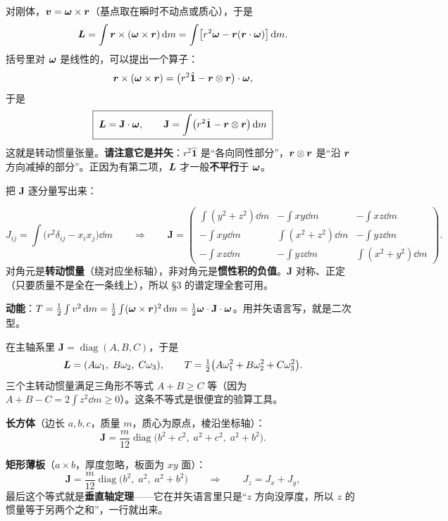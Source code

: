 \documentclass[11pt]{ctexart}
\newcommand{\ten}[1]{\mathbf{#1}}
\newcommand{\unitd}{\hat{\ten{1}}}
\let\origsubhdr\subhdr
\renewcommand{\subhdr}[1]{\par\needspace{3\baselineskip}\origsubhdr{#1}}
\begin{document}
对刚体，$\boldsymbol{v}=\boldsymbol{\omega}\times\boldsymbol{r}$（基点取在瞬时不动点或质心），于是
\[
\boldsymbol{L}=\int\boldsymbol{r}\times(\boldsymbol{\omega}\times\boldsymbol{r})\,\mathrm{d} m
=\int\bigl[r^2\boldsymbol{\omega}-\boldsymbol{r}(\boldsymbol{r}\cdot\boldsymbol{\omega})\bigr]\,\mathrm{d} m .
\]
括号里对 $\boldsymbol{\omega}$ 是线性的，可以提出一个算子：
\[
\vect r\times(\vect\omega\times\vect r)=\bigl(r^2\unitd-\vect r\otimes\vect r\bigr)\cdot\vect\omega ,
\]
于是
\[
\boxed{\;\vect L=\ten J\cdot\vect\omega,\qquad
\ten J=\int\bigl(r^2\unitd-\vect r\otimes\vect r\bigr)\dd m\;}
\]
这就是转动惯量张量。\textbf{请注意它是并矢}：$r^2\unitd$ 是“各向同性部分”，$\boldsymbol{r}\otimes\boldsymbol{r}$ 是“沿 $\boldsymbol{r}$ 方向减掉的部分”。正因为有第二项，$\boldsymbol{L}$ 才一般\textbf{不平行}于 $\boldsymbol{\omega}$。


把 $\ten J$ 逐分量写出来：

\[
J_{ij}=\int\bigl(r^2\delta_{ij}-x_ix_j\bigr)\dd m
\qquad\Longrightarrow\qquad
\ten J=
\begin{pmatrix}
\int(y^2+z^2)\dd m & -\int xy\dd m & -\int xz\dd m\\[3pt]
-\int xy\dd m & \int(x^2+z^2)\dd m & -\int yz\dd m\\[3pt]
-\int xz\dd m & -\int yz\dd m & \int(x^2+y^2)\dd m
\end{pmatrix}.
\]
对角元是\textbf{转动惯量}（绕对应坐标轴），非对角元是\textbf{惯性积的负值}。$\ten J$ 对称、正定（只要质量不是全在一条线上），所以 §3 的谱定理全套可用。

\textbf{动能}：$T=\frac12\int v^2\dd m=\frac12\int(\vect\omega\times\vect r)^2\dd m=\frac12\vect\omega\cdot\ten J\cdot\vect\omega$。用并矢语言写，就是二次型。


在主轴系里 $\ten J=\operatorname{diag}(A,B,C)$，于是
\[
\boldsymbol{L}=(A\omega_1,\;B\omega_2,\;C\omega_3),
\qquad
T=\tfrac12\bigl(A\omega_1^2+B\omega_2^2+C\omega_3^2\bigr).
\]
三个主转动惯量满足三角形不等式 $A+B\ge C$ 等（因为 $A+B-C=2\int z^2\dd m\ge0$）。这条不等式是很便宜的验算工具。


\textbf{长方体}（边长 $a,b,c$，质量 $m$，质心为原点，棱沿坐标轴）：
\[
\ten J=\frac{m}{12}\operatorname{diag}\bigl(b^2+c^2,\;a^2+c^2,\;a^2+b^2\bigr).
\]

\textbf{矩形薄板}（$a\times b$，厚度忽略，板面为 $xy$ 面）：
\[
\ten J=\frac{m}{12}\operatorname{diag}\bigl(b^2,\;a^2,\;a^2+b^2\bigr)
\qquad\Longrightarrow\qquad J_z=J_x+J_y ,
\]
最后这个等式就是\textbf{垂直轴定理}——它在并矢语言里只是“$z$ 方向没厚度，所以 $z$ 的惯量等于另两个之和”，一行就出来。
\end{document}
